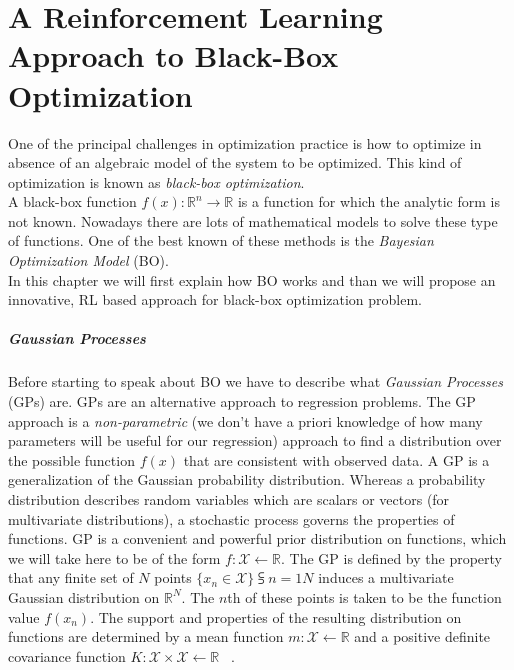\chapter{A Reinforcement Learning Approach to Black-Box Optimization}

One of the principal challenges in optimization practice is how to optimize in absence of an algebraic model of the system to be optimized. This kind of optimization is known as \textit{black-box optimization}. \\

A black-box function $f(x) : \mathbb{R}^n \rightarrow \mathbb{R}$ is a function for which the analytic form is not known. Nowadays there are lots of mathematical models to solve these type of functions. One of the best known of these methods is the \textit{Bayesian Optimization Model} (BO). \\
In this chapter we will first explain how BO works and than we will propose an innovative, RL based approach for black-box optimization problem.

\paragraph{Gaussian Processes} Before starting to speak about BO we have to describe what \textit{Gaussian Processes} (GPs) are. GPs are an alternative approach to regression problems. The GP approach is a \textit{non-parametric} (we don't have a priori knowledge of how many parameters will be useful for our regression) approach to find a distribution over the possible function $f(x)$ that are consistent with observed data. A GP is a generalization of the Gaussian probability distribution. Whereas a probability distribution describes random variables which are scalars or vectors (for multivariate distributions), a stochastic process governs the properties of functions.
GP is a convenient and powerful prior distribution on functions, which we will take here to be of the form $f : \mathcal{X} \leftarrow \mathbb{R}$. The GP is defined by the property that any finite set of $N$ points $\{x_n \in \mathcal{X}\}\subsup{}{ n=1}{N}$ induces a multivariate Gaussian distribution  on $\mathbb{R}^N$. The $n$th of these points is taken to be the function value $f(x_n)$. The support and properties of the resulting distribution on functions are determined by a mean function $m : \mathcal{X} \leftarrow \mathbb{R}$ and a positive definite covariance function $K : \mathcal{X} \times \mathcal{X} \leftarrow \mathbb{R}$ ~\cite{NIPS2012_4522}.

